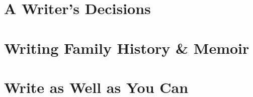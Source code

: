 \documentclass{article}
\numberwithin{equation}{section}
\begin{document}
\section{A Writer's Decisions}


\section{Writing Family History \& Memoir}


\section{Write as Well as You Can}


\printbibliography[heading=bibintoc]
	
\end{document}
